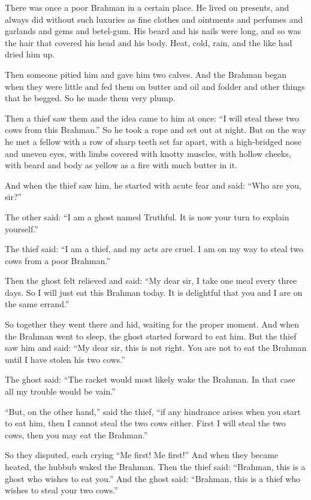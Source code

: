 \documentclass[article, twoside, 14pt]{memoir}
\begin{document}
\label{s57}

There was once a poor Brahman in a certain place. He lived on
presents, and always did without such luxuries as fine clothes and
ointments and perfumes and garlands and gems and betel-gum. His
beard and his nails were long, and so was the hair that covered his
head and his body. Heat, cold, rain, and the like had dried him
up.

Then someone pitied him and gave him two calves. And the Brahman
began when they were little and fed them on butter and oil and
fodder and other things that he begged. So he made them very
plump.

Then a thief saw them and the idea came to him at once:
``I will steal these two cows from this Brahman.'' So he took
a rope and set out at night. But on the way he met a fellow with a
row of sharp teeth set far apart, with a high-bridged nose and
uneven eyes, with limbs covered with knotty muscles, with hollow
cheeks, with beard and body as yellow as a fire with much butter in
it.

And when the thief saw him, he started with acute fear and said:
``Who are you, sir?''

The other said:
``I am a ghost named Truthful. It is now your turn to explain yourself.''

The thief said:
``I am a thief, and my acts are cruel. I am on my way to steal two cows from a poor Brahman.''

Then the ghost felt relieved and said:
``My dear sir, I take one meal every three days. So I will just eat this Brahman today. It is delightful that you and I are on the same errand.''

So together they went there and hid, waiting for the proper moment.
And when the Brahman went to sleep, the ghost started forward to
eat him. But the thief saw him and said:
``My dear sir, this is not right. You are not to eat the Brahman until I have stolen his two cows.''

The ghost said:
``The racket would most likely wake the Brahman. In that case all my trouble would be vain.''

``But, on the other hand,'' said the thief,
``if any hindrance arises when you start to eat him, then I cannot steal the two cows either. First I will steal the two cows, then you may eat the Brahman.''

So they disputed, each crying ``Me first! Me first!'' And when they
became heated, the hubbub waked the Brahman. Then the thief said:
``Brahman, this is a ghost who wishes to eat you.'' And the ghost
said:
``Brahman, this is a thief who wishes to steal your two cows.''
\end{document}
